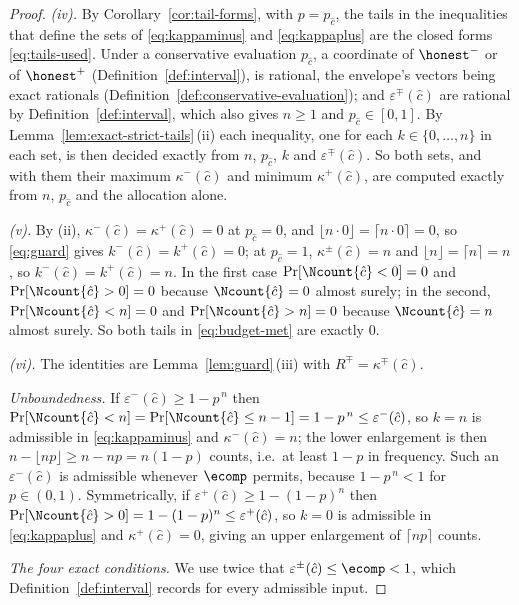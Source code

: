 \begin{proof}
\emph{(iv).} By Corollary~\ref{cor:tail-forms}, with $p=p_{\hat c}$, the
tails in the inequalities that define the sets of \eqref{eq:kappaminus} and
\eqref{eq:kappaplus} are the closed forms \eqref{eq:tails-used}. Under a
conservative evaluation $p_{\hat c}$, a coordinate of ${\honest}^{-}$ or of
${\honest}^{+}$ (Definition~\ref{def:interval}), is rational, the envelope's
vectors being exact rationals (Definition~\ref{def:conservative-evaluation});
and $\varepsilon^{\mp}(\hat c)$ are rational by
Definition~\ref{def:interval}, which also gives $n\ge1$ and
$p_{\hat c}\in[0,1]$. By
Lemma~\ref{lem:exact-strict-tails}\,(ii) each inequality, one for each
$k\in\{0,\dots,n\}$ in each set, is then decided exactly from $n$,
$p_{\hat c}$, $k$ and $\varepsilon^{\mp}(\hat c)$. So both sets, and with
them their maximum $\kappa^{-}(\hat c)$ and minimum $\kappa^{+}(\hat c)$, are
computed exactly from $n$, $p_{\hat c}$ and the allocation alone.

\emph{(v).} By (ii), $\kappa^{-}(\hat c)=\kappa^{+}(\hat c)=0$ at
$p_{\hat c}=0$, and $\lfloor n\cdot0\rfloor=\lceil n\cdot0\rceil=0$, so
\eqref{eq:guard} gives $k^{-}(\hat c)=k^{+}(\hat c)=0$; at $p_{\hat c}=1$,
$\kappa^{\pm}(\hat c)=n$ and $\lfloor n\rfloor=\lceil n\rceil=n$, so
$k^{-}(\hat c)=k^{+}(\hat c)=n$. In the first case
$\Pr[\Ncount{\hat c}<0]=0$ and $\Pr[\Ncount{\hat c}>0]=0$ because
$\Ncount{\hat c}=0$ almost surely; in the second, $\Pr[\Ncount{\hat c}<n]=0$
and $\Pr[\Ncount{\hat c}>n]=0$ because $\Ncount{\hat c}=n$ almost surely. So
both tails in \eqref{eq:budget-met} are exactly $0$.

\emph{(vi).} The identities are Lemma~\ref{lem:guard}\,(iii) with
$R^{\mp}=\kappa^{\mp}(\hat c)$.

\emph{Unboundedness.} If $\varepsilon^{-}(\hat c)\ge1-p^{\,n}$ then
$\Pr[\Ncount{\hat c}<n]=\Pr[\Ncount{\hat c}\le n-1]=1-p^{\,n}
\le\varepsilon^{-}(\hat c)$, so $k=n$ is admissible in \eqref{eq:kappaminus}
and $\kappa^{-}(\hat c)=n$; the lower enlargement is then
$n-\lfloor np\rfloor\ge n-np=n(1-p)$ counts, i.e.\ at least $1-p$ in
frequency. Such an $\varepsilon^{-}(\hat c)$ is admissible whenever $\ecomp$
permits, because $1-p^{\,n}<1$ for $p\in(0,1)$. Symmetrically, if
$\varepsilon^{+}(\hat c)\ge1-(1-p)^{n}$ then
$\Pr[\Ncount{\hat c}>0]=1-(1-p)^{n}\le\varepsilon^{+}(\hat c)$, so $k=0$ is
admissible in \eqref{eq:kappaplus} and $\kappa^{+}(\hat c)=0$, giving an upper
enlargement of $\lceil np\rceil$ counts.

\emph{The four exact conditions.} We use twice that
$\varepsilon^{\pm}(\hat c)\le\ecomp<1$, which
Definition~\ref{def:interval} records for every admissible input.


\end{proof}
